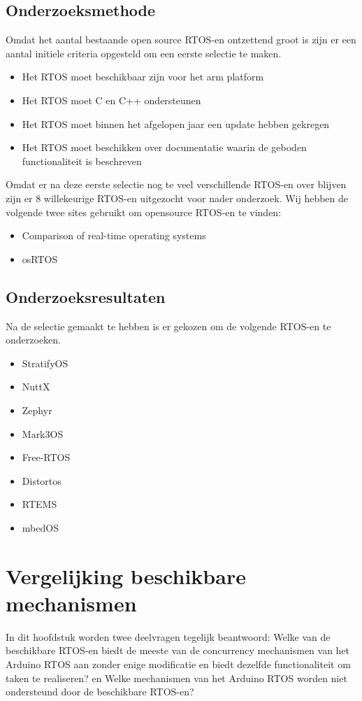 \documentclass{article}
\begin{document}
\subsection{Onderzoeksmethode}
Omdat het aantal bestaande open source RTOS-en ontzettend groot is zijn er een aantal initiele criteria opgesteld om een eerste selectie te maken.
\begin{itemize}
\item Het RTOS moet beschikbaar zijn voor het arm platform
\item Het RTOS moet C en C++ ondersteunen
\item Het RTOS moet binnen het afgelopen jaar een update hebben gekregen
\item Het RTOS moet beschikken over documentatie waarin de geboden functionaliteit is beschreven
\end{itemize}
Omdat er na deze eerste selectie nog te veel verschillende RTOS-en over blijven zijn er 8 willekeurige RTOS-en uitgezocht voor nader onderzoek.
Wij hebben de volgende twee sites gebruikt om opensource RTOS-en te vinden:
\begin{itemize}
    \item Comparison of real-time operating systems \cite{WikipediaRTOS}
    \item osRTOS \cite{OSRTOS}
\end{itemize}
\subsection{Onderzoeksresultaten}
Na de selectie gemaakt te hebben is er gekozen om de volgende RTOS-en te onderzoeken.
\begin{itemize}
\item StratifyOS \cite{StratifyGithub}
\item NuttX \cite{NuttX}
\item Zephyr \cite{Zephyr}
\item Mark3OS \cite{Mark3OS}
\item Free-RTOS\cite{free-rtos}
\item Distortos \cite{Distortos}
\item RTEMS      \cite{RTEMS}
\item mbedOS      \cite{mbedOS}
\end{itemize}

\section{Vergelijking beschikbare mechanismen}
In dit hoofdstuk worden twee deelvragen tegelijk beantwoord:
Welke van de beschikbare RTOS-en biedt de meeste van de concurrency mechanismen van het Arduino RTOS aan zonder enige modificatie en biedt dezelfde functionaliteit om taken te realiseren?
en Welke mechanismen van het Arduino RTOS worden niet ondersteund door de beschikbare RTOS-en?
\end{document}
